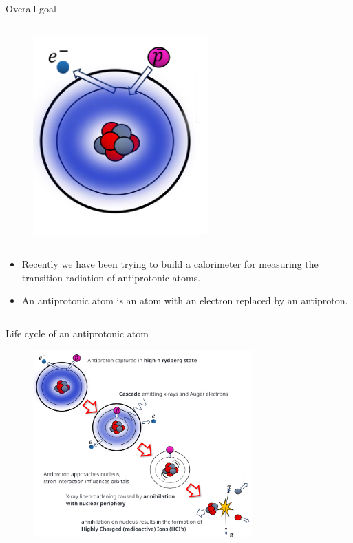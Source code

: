 \begin{columnframe}{Overall goal}
    \begin{column}{0.5\textwidth}
        \begin{figure}
            \centering
            \includegraphics[width=0.6\textwidth]{images/antiprotonic_atom.png}
        \end{figure}
    \end{column}
    \begin{column}{0.5\textwidth}
        \begin{itemize}
            \item Recently we have been trying to build a calorimeter for measuring the transition radiation of antiprotonic atoms.
            \item An antiprotonic atom is an atom with an electron replaced by an antiproton.
        \end{itemize}
    \end{column}
\end{columnframe}

\begin{frame}{Life cycle of an antiprotonic atom}
    \begin{figure}
        \centering
        \includegraphics[width=0.75\textwidth]{images/formation_of_hci.png}
    \end{figure}
\end{frame}

